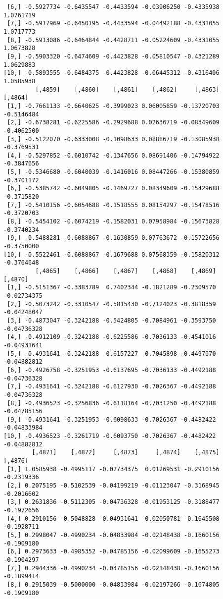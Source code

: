 \documentclass[
  letterpaper,
  DIV=11,
  numbers=noendperiod]{scrreprt}
\begin{document}
\begin{verbatim}
 [6,] -0.5927734 -0.6435547 -0.4433594 -0.03906250 -0.4335938 1.0761719
 [7,] -0.5917969 -0.6450195 -0.4433594 -0.04492188 -0.4331055 1.0717773
 [8,] -0.5913086 -0.6464844 -0.4428711 -0.05224609 -0.4331055 1.0673828
 [9,] -0.5903320 -0.6474609 -0.4423828 -0.05810547 -0.4321289 1.0629883
[10,] -0.5893555 -0.6484375 -0.4423828 -0.06445312 -0.4316406 1.0585938
         [,4859]    [,4860]    [,4861]    [,4862]     [,4863]    [,4864]
 [1,] -0.7661133 -0.6640625 -0.3999023 0.06005859 -0.13720703 -0.5146484
 [2,] -0.6738281 -0.6225586 -0.2929688 0.02636719 -0.08349609 -0.4062500
 [3,] -0.5122070 -0.6333008 -0.1098633 0.08886719 -0.13085938 -0.3769531
 [4,] -0.5297852 -0.6010742 -0.1347656 0.08691406 -0.14794922 -0.3847656
 [5,] -0.5346680 -0.6040039 -0.1416016 0.08447266 -0.15380859 -0.3701172
 [6,] -0.5385742 -0.6049805 -0.1469727 0.08349609 -0.15429688 -0.3715820
 [7,] -0.5410156 -0.6054688 -0.1518555 0.08154297 -0.15478516 -0.3720703
 [8,] -0.5454102 -0.6074219 -0.1582031 0.07958984 -0.15673828 -0.3740234
 [9,] -0.5488281 -0.6088867 -0.1630859 0.07763672 -0.15722656 -0.3750000
[10,] -0.5522461 -0.6088867 -0.1679688 0.07568359 -0.15820312 -0.3764648
         [,4865]    [,4866]    [,4867]    [,4868]    [,4869]     [,4870]
 [1,] -0.5151367 -0.3383789  0.7402344 -0.1821289 -0.2309570 -0.02734375
 [2,] -0.5073242 -0.3310547 -0.5815430 -0.7124023 -0.3818359 -0.04248047
 [3,] -0.4873047 -0.3242188 -0.5424805 -0.7084961 -0.3593750 -0.04736328
 [4,] -0.4912109 -0.3242188 -0.6225586 -0.7036133 -0.4541016 -0.04931641
 [5,] -0.4931641 -0.3242188 -0.6157227 -0.7045898 -0.4497070 -0.04882812
 [6,] -0.4926758 -0.3251953 -0.6137695 -0.7036133 -0.4492188 -0.04736328
 [7,] -0.4931641 -0.3242188 -0.6127930 -0.7026367 -0.4492188 -0.04736328
 [8,] -0.4936523 -0.3256836 -0.6118164 -0.7031250 -0.4492188 -0.04785156
 [9,] -0.4931641 -0.3251953 -0.6098633 -0.7026367 -0.4482422 -0.04833984
[10,] -0.4936523 -0.3261719 -0.6093750 -0.7026367 -0.4482422 -0.04882812
        [,4871]    [,4872]     [,4873]     [,4874]    [,4875]    [,4876]
 [1,] 1.0585938 -0.4995117 -0.02734375  0.01269531 -0.2910156 -0.2319336
 [2,] 0.2075195 -0.5102539 -0.04199219 -0.01123047 -0.3168945 -0.2016602
 [3,] 0.2631836 -0.5112305 -0.04736328 -0.01953125 -0.3188477 -0.1972656
 [4,] 0.2910156 -0.5048828 -0.04931641 -0.02050781 -0.1645508 -0.1928711
 [5,] 0.2998047 -0.4990234 -0.04833984 -0.02148438 -0.1660156 -0.1909180
 [6,] 0.2973633 -0.4985352 -0.04785156 -0.02099609 -0.1655273 -0.1904297
 [7,] 0.2944336 -0.4990234 -0.04785156 -0.02148438 -0.1660156 -0.1899414
 [8,] 0.2915039 -0.5000000 -0.04833984 -0.02197266 -0.1674805 -0.1909180

\end{verbatim}
\end{document}

